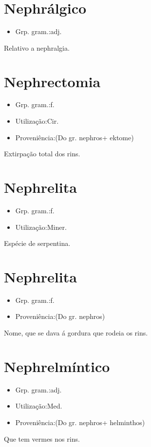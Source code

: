 \section{Nephrálgico}
\begin{itemize}
\item {Grp. gram.:adj.}
\end{itemize}
Relativo a nephralgia.
\section{Nephrectomia}
\begin{itemize}
\item {Grp. gram.:f.}
\end{itemize}
\begin{itemize}
\item {Utilização:Cir.}
\end{itemize}
\begin{itemize}
\item {Proveniência:(Do gr. \textunderscore nephros\textunderscore  + \textunderscore ektome\textunderscore )}
\end{itemize}
Extirpação total dos rins.
\section{Nephrelita}
\begin{itemize}
\item {Grp. gram.:f.}
\end{itemize}
\begin{itemize}
\item {Utilização:Miner.}
\end{itemize}
Espécie de serpentina.
\section{Nephrelita}
\begin{itemize}
\item {Grp. gram.:f.}
\end{itemize}
\begin{itemize}
\item {Proveniência:(Do gr. \textunderscore nephros\textunderscore )}
\end{itemize}
Nome, que se dava á gordura que rodeia os rins.
\section{Nephrelmíntico}
\begin{itemize}
\item {Grp. gram.:adj.}
\end{itemize}
\begin{itemize}
\item {Utilização:Med.}
\end{itemize}
\begin{itemize}
\item {Proveniência:(Do gr. \textunderscore nephros\textunderscore  + \textunderscore helminthos\textunderscore )}
\end{itemize}
Que tem vermes nos rins.
